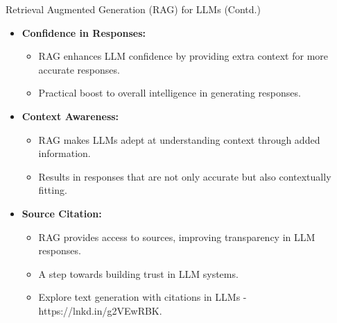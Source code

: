 \begin{frame}[fragile]{Retrieval Augmented Generation (RAG) for LLMs (Contd.)}

\begin{itemize}
  \item \textbf{Confidence in Responses:}
    \begin{itemize}
      \item RAG enhances LLM confidence by providing extra context for more accurate responses.
      \item Practical boost to overall intelligence in generating responses.
    \end{itemize}
  
  \item \textbf{Context Awareness:}
    \begin{itemize}
      \item RAG makes LLMs adept at understanding context through added information.
      \item Results in responses that are not only accurate but also contextually fitting.
    \end{itemize}

  \item \textbf{Source Citation:}
    \begin{itemize}
      \item RAG provides access to sources, improving transparency in LLM responses.
      \item A step towards building trust in LLM systems.
      \item Explore text generation with citations in LLMs - https://lnkd.in/g2VEwRBK.
    \end{itemize}
\end{itemize}

\end{frame}

